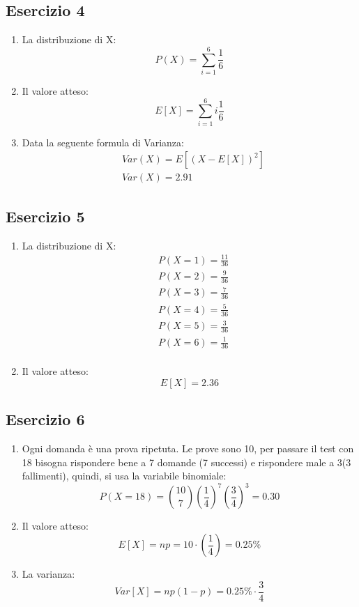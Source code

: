 \documentclass[12pt]{article}
\begin{document}
\subsection*{Esercizio 4}
\begin{enumerate}
    \item La distribuzione di X:
    \[
    P(X) = \sum_{i=1}^6 \frac{1}{6}   
    \]
    \item Il valore atteso:
    \[
    E[X] = \sum_{i = 1}^6 i\frac{1}{6}   
    \]
    \item Data la seguente formula di Varianza:
    \begin{align*}
        &Var(X) = E[(X-E[X])^2] \\
        &Var(X) = 2.91
    \end{align*}
\end{enumerate}
\subsection*{Esercizio 5}

\begin{enumerate}
    \item La distribuzione di X:
    \begin{align*}
        &P(X = 1) = \frac{11}{36} \\
        &P(X = 2) = \frac{9}{36} \\
        &P(X = 3) = \frac{7}{36} \\
        &P(X = 4) = \frac{5}{36} \\
        &P(X = 5) = \frac{3}{36} \\
        &P(X = 6) = \frac{1}{36} \\
    \end{align*}
    \item Il valore atteso: 
    \[
    E[X] = 2.36    
    \]
\end{enumerate}

\subsection*{Esercizio 6}
\begin{enumerate}
    \item Ogni domanda è una prova ripetuta. Le prove sono 10, per passare il test con 18
    bisogna rispondere bene a 7 domande (7 successi) e rispondere male a 3(3 fallimenti), quindi, si 
    usa la variabile binomiale:
    \[
    P(X=18) = \binom{10}{7}\left(\frac{1}{4}\right)^7\left(\frac{3}{4}\right)^3 = 0.30%
    \]
    \item Il valore atteso:
    \[
    E[X] = np = 10\cdot \left(\frac{1}{4}\right) = 0.25 \%    
    \]
    \item La varianza:
    \[
    Var[X] = np(1-p) = 0.25\% \cdot \frac{3}{4}    
    \]    
\end{enumerate}
\end{document}
